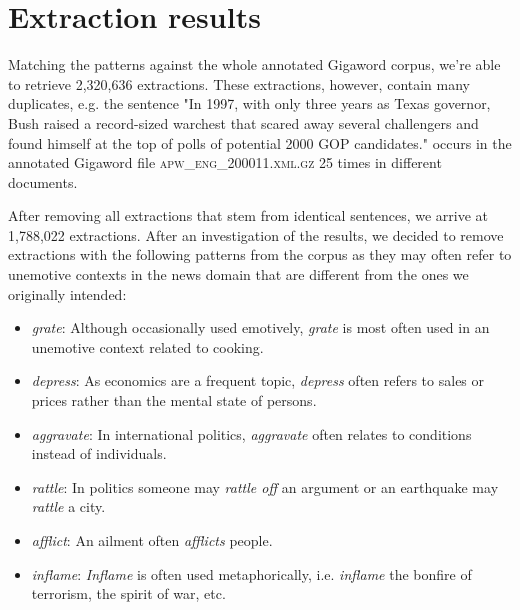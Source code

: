 \section{Extraction results}

Matching the patterns against the whole annotated Gigaword corpus, we're able to retrieve 2,320,636 extractions. These extractions, however, contain many duplicates, e.g. the sentence "In 1997, with only three years as Texas governor, Bush raised a record-sized warchest that scared away several challengers and found himself at the top of polls of potential 2000 GOP candidates." occurs in the annotated Gigaword file \textsc{apw\_eng\_200011.xml.gz} 25 times in different documents.

After removing all extractions that stem from identical sentences, we arrive at 1,788,022 extractions. After an investigation of the results, we decided to remove extractions with the following patterns from the corpus as they may often refer to unemotive contexts in the news domain that are different from the ones we originally intended:

\begin{itemize}
	\item \textit{grate}: Although occasionally used emotively, \textit{grate} is most often used in an unemotive context related to cooking.
	\item \textit{depress}: As economics are a frequent topic, \textit{depress} often refers to sales or prices rather than the mental state of persons.
	\item \textit{aggravate}: In international politics, \textit{aggravate} often relates to conditions instead of individuals.
	\item \textit{rattle}: In politics someone may \textit{rattle off} an argument or an earthquake may \textit{rattle} a city.
	\item \textit{afflict}: An ailment often \textit{afflicts} people.
	\item \textit{inflame}: \textit{Inflame} is often used metaphorically, i.e. \textit{inflame} the bonfire of terrorism, the spirit of war, etc.
\end{itemize}


